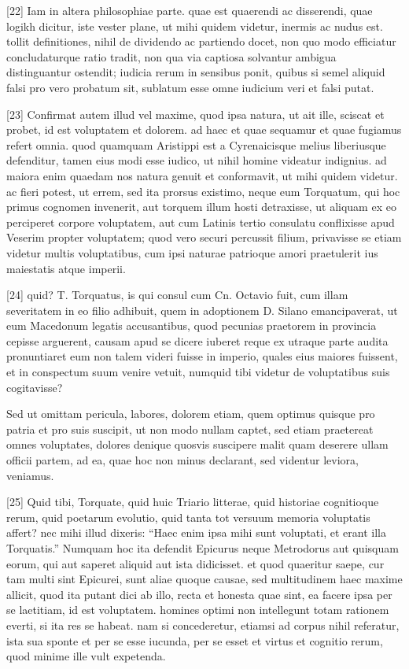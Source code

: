 \documentclass{article}
\begin{document}
[22] Iam in altera philosophiae parte. quae est quaerendi ac disserendi, quae logikh dicitur, iste vester plane, ut mihi quidem videtur, inermis ac nudus est. tollit definitiones, nihil de dividendo ac partiendo docet, non quo modo efficiatur concludaturque ratio tradit, non qua via captiosa solvantur ambigua distinguantur ostendit; iudicia rerum in sensibus ponit, quibus si semel aliquid falsi pro vero probatum sit, sublatum esse omne iudicium veri et falsi putat.

[23] Confirmat autem illud vel maxime, quod ipsa natura, ut ait ille, sciscat et probet, id est voluptatem et dolorem. ad haec et quae sequamur et quae fugiamus refert omnia. quod quamquam Aristippi est a Cyrenaicisque melius liberiusque defenditur, tamen eius modi esse iudico, ut nihil homine videatur indignius. ad maiora enim quaedam nos natura genuit et conformavit, ut mihi quidem videtur. ac fieri potest, ut errem, sed ita prorsus existimo, neque eum Torquatum, qui hoc primus cognomen invenerit, aut torquem illum hosti detraxisse, ut aliquam ex eo perciperet corpore voluptatem, aut cum Latinis tertio consulatu conflixisse apud Veserim propter voluptatem; quod vero securi percussit filium, privavisse se etiam videtur multis voluptatibus, cum ipsi naturae patrioque amori praetulerit ius maiestatis atque imperii.

[24] quid? T. Torquatus, is qui consul cum Cn. Octavio fuit, cum illam severitatem in eo filio adhibuit, quem in adoptionem D. Silano emancipaverat, ut eum Macedonum legatis accusantibus, quod pecunias praetorem in provincia cepisse arguerent, causam apud se dicere iuberet reque ex utraque parte audita pronuntiaret eum non talem videri fuisse in imperio, quales eius maiores fuissent, et in conspectum suum venire vetuit, numquid tibi videtur de voluptatibus suis cogitavisse?

Sed ut omittam pericula, labores, dolorem etiam, quem optimus quisque pro patria et pro suis suscipit, ut non modo nullam captet, sed etiam praetereat omnes voluptates, dolores denique quosvis suscipere malit quam deserere ullam officii partem, ad ea, quae hoc non minus declarant, sed videntur leviora, veniamus.

[25] Quid tibi, Torquate, quid huic Triario litterae, quid historiae cognitioque rerum, quid poetarum evolutio, quid tanta tot versuum memoria voluptatis affert? nec mihi illud dixeris: ``Haec enim ipsa mihi sunt voluptati, et erant illa Torquatis.'' Numquam hoc ita defendit Epicurus neque Metrodorus aut quisquam eorum, qui aut saperet aliquid aut ista didicisset. et quod quaeritur saepe, cur tam multi sint Epicurei, sunt aliae quoque causae, sed multitudinem haec maxime allicit, quod ita putant dici ab illo, recta et honesta quae sint, ea facere ipsa per se laetitiam, id est voluptatem. homines optimi non intellegunt totam rationem everti, si ita res se habeat. nam si concederetur, etiamsi ad corpus nihil referatur, ista sua sponte et per se esse iucunda, per se esset et virtus et cognitio rerum, quod minime ille vult expetenda.
\end{document}
